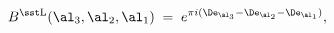 \begin{equation}
B^{\rm\sst L}(\al_3,\al_2,\al_1)\;=\;e^{\pi i(\De_{\al_3}-\De_{\al_2}-
\De_{\al_1})},
\end{equation}


